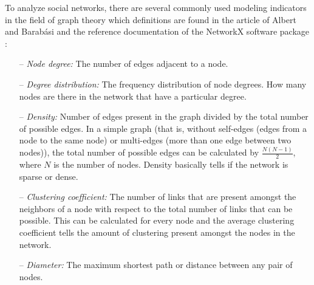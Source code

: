 To analyze social networks, there are several commonly used modeling indicators in the field of graph theory which definitions are found in the article of Albert and Barabási \cite{Albert2001StatisticalMO} and the reference documentation of the NetworkX software package \cite{hagberg2008exploring}:
\begin{itemize}
    \item[--] \textit{Node degree:} The number of edges adjacent to a node.
    \item[--] \textit{Degree distribution:} The frequency distribution of node degrees. How many nodes are there in the network that have a particular degree.
    \item[--] \textit{Density:} Number of edges present in the graph divided by the total number of possible edges. In a simple graph (that is, without self-edges (edges from a node to the same node) or multi-edges (more than one edge between two nodes)), the total number of possible edges can be calculated by $\frac{N(N - 1)}{2}$, where $N$ is the number of nodes. Density basically tells if the network is sparse or dense.
    \item[--] \textit{Clustering coefficient:}  The number of links that are present amongst the neighbors of a node with respect to the total number of links that can be possible. This can be calculated for every node and the average clustering coefficient tells the amount of clustering present amongst the nodes in the network.
    \item[--] \textit{Diameter:} The maximum shortest path or distance between any pair of nodes.
\end{itemize}



